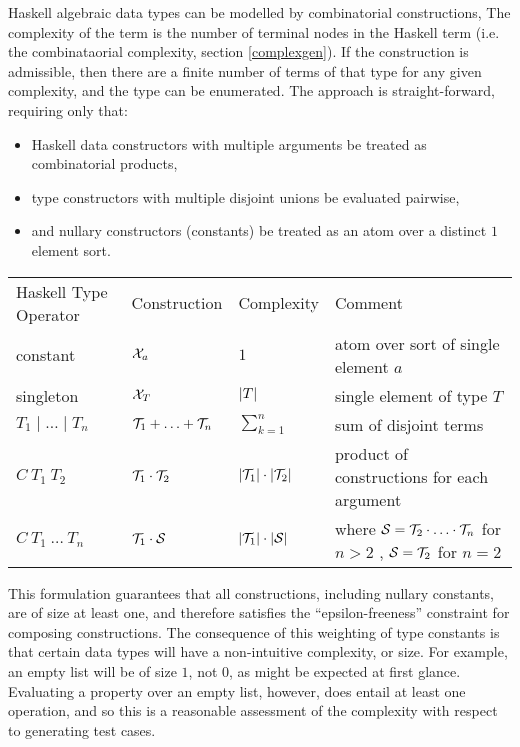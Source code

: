 
Haskell algebraic data types can be modelled by combinatorial constructions,
The complexity of the term is the number of terminal nodes in the Haskell term
(i.e. the combinataorial complexity, section \ref{complexgen}).
If the construction is admissible,
then there are a finite number of terms of that type for any given complexity,
and the type can be enumerated.
The approach is straight-forward,
requiring only that:
\begin{itemize}
\item Haskell data constructors with multiple arguments
be treated as combinatorial products,
\item type constructors with multiple disjoint unions be evaluated pairwise, 
\item and nullary constructors (constants) be treated as an atom over a distinct $1$ element sort.
\end{itemize}

\begin{tabular}[b]{llll}\label{countseq}
Haskell Type Operator & Construction & Complexity & Comment\\
constant & $\mathcal{X}_{a}$ & $1$ &atom over sort of single element $a$ \\
singleton & $\mathcal{X}_{T}$ & $\lvert T\rvert$ & single element of type $T$ \\
$T_1 \mid \dots \mid T_n $ & $\spec{T}_{1} \splus \dots \splus \spec{T}_{n}$ & $\sum_{k=1}^{n} $ & sum of disjoint terms \\
$C\ T_1\ T_2 $ & $ \mathcal{T}_{1} \cdot \mathcal{T}_{2}$ & $\lvert\mathcal{T}_{1}\rvert \cdot\lvert\mathcal{T}_{2}\rvert $ &  
                   product of constructions for each argument  \\
$C\ T_1\ \dots\ T_n $ & $ \mathcal{T}_{1} \cdot \mathcal{S}$ & $\lvert\mathcal{T}_{1}\rvert \cdot\lvert\mathcal{S}\rvert $ &  
                   where  $\spec{S} = \spec{T}_{2}\sprod \dots \sprod \spec{T}_{n}$ for $n > 2$ , $\mathcal{S} = \mathcal{T}_{2}$ for $n = 2$
\end{tabular}

\noindent
This formulation guarantees that all constructions, 
including nullary constants,
are of size at least one,
and therefore satisfies the ``epsilon-freeness'' constraint for composing constructions.
The consequence of this weighting of type constants 
is that certain data types will have a non-intuitive complexity, or size.
For example,
an empty list will be of size $1$, not $0$,
as might be expected at first glance.
Evaluating a property over an empty list, however,
does entail at least one operation,
and so this is a reasonable assessment of the complexity
with respect to generating test cases.

